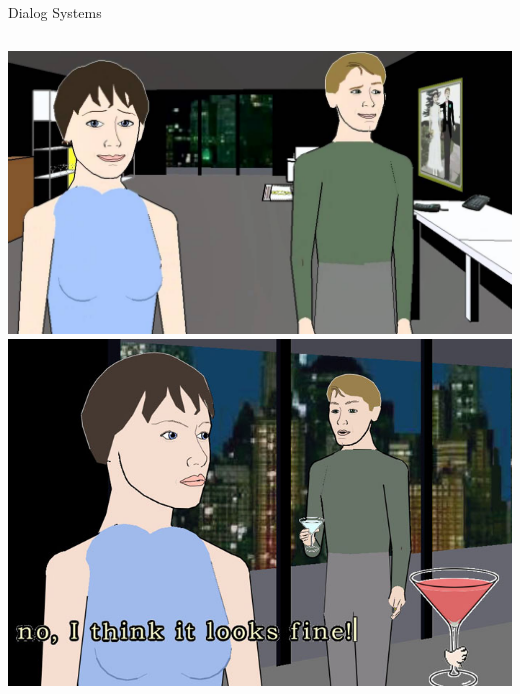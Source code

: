 \documentclass[xcolor={usenames,svgnames,x11names,dvipsnames,table}]{beamer}
\begin{document}
\begin{frame}{Dialog Systems}
\begin{columns}
        \includegraphics[width=1\linewidth]{./img/facade}\\
        \includegraphics[width=1\linewidth]{./img/facade2}
    \end{columns}
\end{frame}
\end{document}
